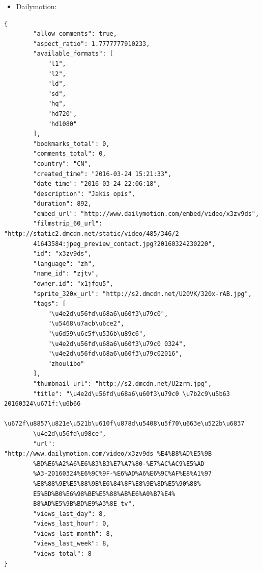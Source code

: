 \documentclass{article}
\begin{document}
\begin{itemize}
    \item Dailymotion:
\end{itemize}
\begin{Verbatim}
{
        "allow_comments": true, 
        "aspect_ratio": 1.7777777910233, 
        "available_formats": [
            "l1", 
            "l2", 
            "ld", 
            "sd", 
            "hq", 
            "hd720", 
            "hd1080"
        ], 
        "bookmarks_total": 0, 
        "comments_total": 0, 
        "country": "CN", 
        "created_time": "2016-03-24 15:21:33", 
        "date_time": "2016-03-24 22:06:18", 
        "description": "Jakis opis", 
        "duration": 892, 
        "embed_url": "http://www.dailymotion.com/embed/video/x3zv9ds", 
        "filmstrip_60_url": "http://static2.dmcdn.net/static/video/485/346/2
        41643584:jpeg_preview_contact.jpg?20160324230220", 
        "id": "x3zv9ds", 
        "language": "zh", 
        "name_id": "zjtv", 
        "owner.id": "x1jfqu5", 
        "sprite_320x_url": "http://s2.dmcdn.net/U20VK/320x-rAB.jpg", 
        "tags": [
            "\u4e2d\u56fd\u68a6\u60f3\u79c0", 
            "\u5468\u7acb\u6ce2", 
            "\u6d59\u6c5f\u536b\u89c6", 
            "\u4e2d\u56fd\u68a6\u60f3\u79c0 0324", 
            "\u4e2d\u56fd\u68a6\u60f3\u79c02016", 
            "zhoulibo"
        ], 
        "thumbnail_url": "http://s2.dmcdn.net/U2zrm.jpg", 
        "title": "\u4e2d\u56fd\u68a6\u60f3\u79c0 \u7b2c9\u5b63 20160324\u671f:\u6b66
        \u672f\u8857\u821e\u521b\u610f\u878d\u5408\u5f70\u663e\u522b\u6837
        \u4e2d\u56fd\u98ce", 
        "url": "http://www.dailymotion.com/video/x3zv9ds_%E4%B8%AD%E5%9B
        %BD%E6%A2%A6%E6%83%B3%E7%A7%80-%E7%AC%AC9%E5%AD
        %A3-20160324%E6%9C%9F-%E6%AD%A6%E6%9C%AF%E8%A1%97
        %E8%88%9E%E5%88%9B%E6%84%8F%E8%9E%8D%E5%90%88%
        E5%BD%B0%E6%98%BE%E5%88%AB%E6%A0%B7%E4%
        B8%AD%E5%9B%BD%E9%A3%8E_tv", 
        "views_last_day": 8, 
        "views_last_hour": 0, 
        "views_last_month": 8, 
        "views_last_week": 8, 
        "views_total": 8
}
\end{Verbatim}
\end{document}
